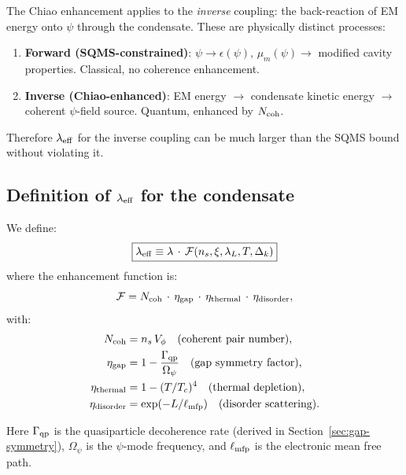 \documentclass[12pt,aps,prd,twocolumn,superscriptaddress,nofootinbib]{revtex4-2}
\newcommand{\lam}{\lambda}
\begin{document}
The Chiao enhancement applies to the \emph{inverse} coupling: the
back-reaction of EM energy onto $\psi$ through the condensate. These
are physically distinct processes:

\begin{enumerate}[nosep]
\item \textbf{Forward (SQMS-constrained)}: $\psi \to \epsilon(\psi),\,
\mu_m(\psi) \to$ modified cavity properties. Classical, no coherence
enhancement.

\item \textbf{Inverse (Chiao-enhanced)}: EM energy $\to$ condensate
kinetic energy $\to$ coherent $\psi$-field source. Quantum, enhanced
by $N_{\rm coh}$.
\end{enumerate}

Therefore $\lam_{\rm eff}$ for the inverse coupling can be much larger
than the SQMS bound without violating it.

\subsection{Definition of $\lambda_{\rm eff}$ for the condensate}

We define:
\begin{equation}\label{eq:lambda-eff-def}
\boxed{
\lam_{\rm eff} \equiv \lam\,\cdot\,\mathcal{F}(n_s, \xi, \lambda_L, T, \Delta_k)
}
\end{equation}
where the enhancement function is:
\begin{equation}\label{eq:F-enhancement}
\mathcal{F} = N_{\rm coh}\,\cdot\,\eta_{\rm gap}\,\cdot\,
\eta_{\rm thermal}\,\cdot\,\eta_{\rm disorder},
\end{equation}
with:
\begin{align}
N_{\rm coh} &= n_s\,V_\phi\quad\text{(coherent pair number)},
\label{eq:Ncoh-def} \\
\eta_{\rm gap} &= 1 - \frac{\Gamma_{\rm qp}}{\Omega_\psi}
\quad\text{(gap symmetry factor)},
\label{eq:eta-gap} \\
\eta_{\rm thermal} &= 1 - (T/T_c)^4
\quad\text{(thermal depletion)},
\label{eq:eta-thermal} \\
\eta_{\rm disorder} &= \exp(-L/\ell_{\rm mfp})
\quad\text{(disorder scattering)}.
\label{eq:eta-disorder}
\end{align}

Here $\Gamma_{\rm qp}$ is the quasiparticle decoherence rate (derived
in Section~\ref{sec:gap-symmetry}), $\Omega_\psi$ is the $\psi$-mode
frequency, and $\ell_{\rm mfp}$ is the electronic mean free path.
\end{document}
